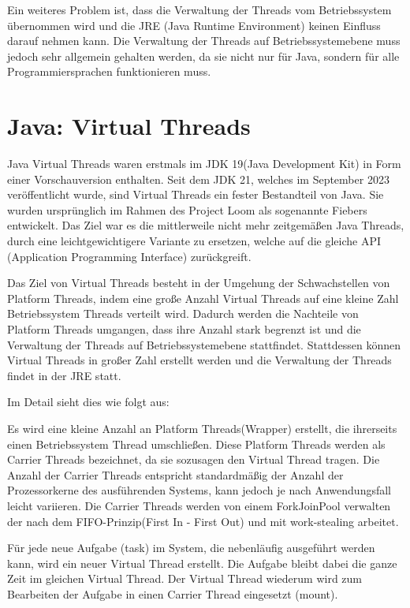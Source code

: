 \documentclass[fontsize=12pt,paper=a4,twoside=semi,parskip=half-,headsepline,headinclude]{scrreprt}
\begin{document}
Ein weiteres Problem ist, dass die Verwaltung der Threads vom Betriebssystem über\-nommen wird und die JRE (Java Runtime Environment) keinen Einfluss darauf nehmen kann. Die Verwaltung der Threads auf Betriebssystemebene muss jedoch sehr allgemein gehalten werden, da sie nicht nur für Java, sondern für alle Programmiersprachen funktionieren muss.

\section{Java: Virtual Threads}

Java Virtual Threads waren erstmals im JDK 19(Java Development Kit) in Form einer Vorschauversion enthalten. Seit dem JDK 21, welches im September 2023 veröffentlicht wurde, sind Virtual Threads ein fester Bestandteil von Java. Sie wurden ursprünglich im Rahmen des Project Loom als sogenannte Fiebers entwickelt. Das Ziel war es die mittlerweile nicht mehr zeitgemäßen Java Threads, durch eine leichtgewichtigere Variante zu ersetzen, welche auf die gleiche API (Application Programming Interface) zurückgreift.

Das Ziel von Virtual Threads besteht in der Umgehung der Schwachstellen von Platform Threads, indem eine große Anzahl Virtual Threads auf eine kleine Zahl Betriebssystem Threads verteilt wird. Dadurch werden die Nachteile von Platform Threads umgangen, dass ihre Anzahl stark begrenzt ist und die Verwaltung der Threads auf Betriebssystemebene stattfindet. Stattdessen können Virtual Threads in großer Zahl erstellt werden und die Verwaltung der Threads findet in der JRE statt.

Im Detail sieht dies wie folgt aus:

Es wird eine kleine Anzahl an Platform Threads(Wrapper) erstellt, die ihrerseits einen Betriebssystem Thread umschließen. Diese Platform Threads werden als Carrier Threads bezeichnet, da sie sozusagen den Virtual Thread tragen. Die Anzahl der Carrier Threads entspricht standardmäßig der Anzahl der Prozessorkerne des ausführenden Systems, kann jedoch je nach Anwendungsfall leicht variieren. Die Carrier Threads werden von einem ForkJoinPool verwalten der nach dem FIFO-Prinzip(First In - First Out) und mit work-stealing arbeitet.\cite{Pressler2023a}

Für jede neue Aufgabe (task) im System, die nebenläufig ausgeführt werden kann, wird ein neuer Virtual Thread erstellt. Die Aufgabe bleibt dabei die ganze Zeit im gleichen Virtual Thread. Der Virtual Thread wiederum wird zum Bearbeiten der Aufgabe in einen Carrier Thread eingesetzt (mount). 
\end{document}
